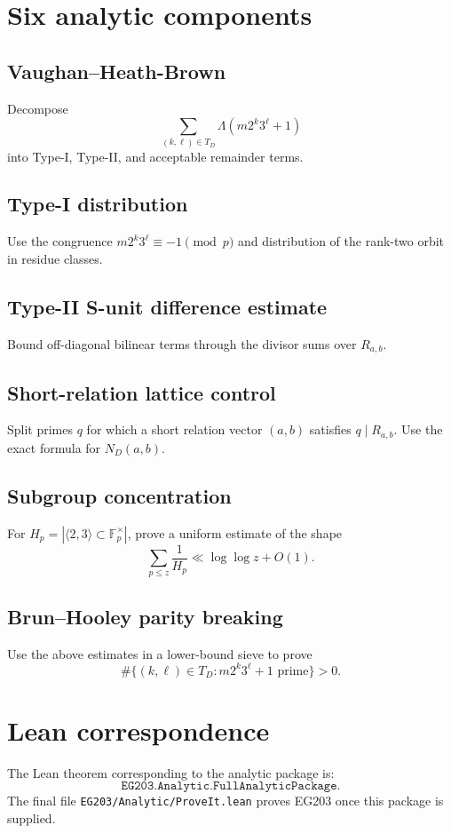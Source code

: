 \documentclass[11pt]{article}
\begin{document}
\section{Six analytic components}

\subsection{Vaughan--Heath-Brown}
Decompose
\[
\sum_{(k,\ell)\in T_D}\Lambda(m2^k3^\ell+1)
\]
into Type-I, Type-II, and acceptable remainder terms.

\subsection{Type-I distribution}
Use the congruence \(m2^k3^\ell\equiv-1\pmod p\) and distribution of the
rank-two orbit in residue classes.

\subsection{Type-II S-unit difference estimate}
Bound off-diagonal bilinear terms through the divisor sums over \(R_{a,b}\).

\subsection{Short-relation lattice control}
Split primes \(q\) for which a short relation vector \((a,b)\) satisfies
\(q\mid R_{a,b}\).  Use the exact formula for \(N_D(a,b)\).

\subsection{Subgroup concentration}
For \(H_p=|\langle 2,3\rangle\subset\mathbb F_p^\times|\), prove a uniform
estimate of the shape
\[
\sum_{p\le z}\frac1{H_p}\ll \log\log z+O(1).
\]

\subsection{Brun--Hooley parity breaking}
Use the above estimates in a lower-bound sieve to prove
\[
\#\{(k,\ell)\in T_D:m2^k3^\ell+1\text{ prime}\}>0.
\]

\section{Lean correspondence}

The Lean theorem corresponding to the analytic package is:
\[
\texttt{EG203.Analytic.FullAnalyticPackage}.
\]
The final file \texttt{EG203/Analytic/ProveIt.lean} proves EG203 once this
package is supplied.
\end{document}
